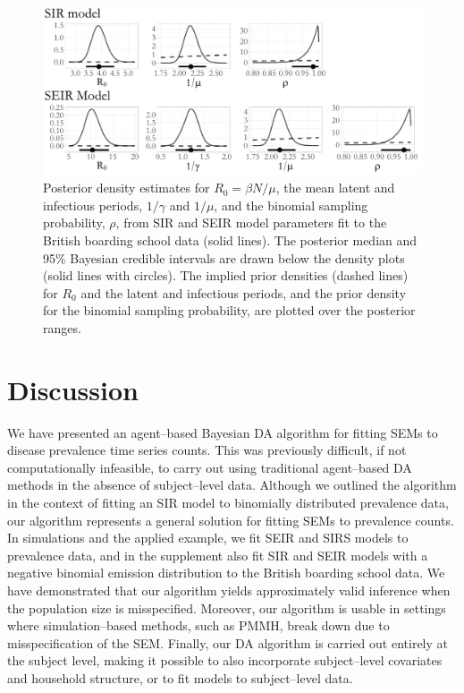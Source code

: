 \begin{figure}
	\centering
	\includegraphics[width=0.95\linewidth]{figures/bbs_densities.pdf}
	\caption[Posterior estimates of SIR and SEIR model parameters fit to British boarding school outbreak data.]{Posterior density estimates for $ R_0 = \beta N /\mu $, the mean latent and infectious periods, $ 1/\gamma $ and $ 1/\mu $, and the binomial sampling probability, $ \rho $, from SIR and SEIR model parameters fit to the British boarding school data (solid lines). The posterior median and 95\% Bayesian credible intervals are drawn below the density plots (solid lines with circles). The implied prior densities (dashed lines) for $ R_0 $ and the latent and infectious periods, and the prior density for the binomial sampling probability, are plotted over the posterior ranges.}
	\label{fig:bbs_densities}
\end{figure}

\section{Discussion}
\label{sec:bda_discussion}

We have presented an agent--based Bayesian DA algorithm for fitting SEMs to disease prevalence time series counts. This was previously difficult, if not computationally infeasible, to carry out using traditional agent--based DA methods in the absence of subject--level data. Although we outlined the algorithm in the context of fitting an SIR model to binomially distributed prevalence data, our algorithm represents a general solution for fitting SEMs to prevalence counts. In simulations and the applied example, we fit SEIR and SIRS models to prevalence data, and in the supplement also fit SIR and SEIR models with a negative binomial emission distribution to the British boarding school data. We have demonstrated that our algorithm yields approximately valid inference when the population size is misspecified. Moreover, our algorithm is usable in settings where simulation--based methods, such as PMMH, break down due to misspecification of the SEM. Finally, our DA algorithm is carried out entirely at the subject level, making it possible to also incorporate subject--level covariates and household structure, or to fit models to subject--level data. 

